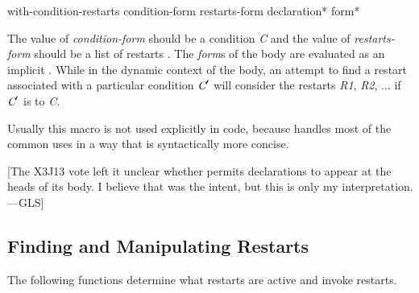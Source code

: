 \begin{defmac}
with-condition-restarts condition-form restarts-form
  {declaration}* {form}*

The value of \emph{condition-form} should be a condition \emph{C} and
the value of \emph{restarts-form} should be a list of restarts .
      The \emph{form\/}s of the body are evaluated as an implicit .
      While in the dynamic context of the body,
      an attempt to find a restart associated with a particular
      condition $\emph{C}'$ will 
      consider the restarts \emph{R1}, \emph{R2}, $\ldots$ if $\emph{C}'$ is  to \emph{C}.

     Usually this macro is not used explicitly in code, because
      handles most of the common uses in a way that is
     syntactically more concise.

[The X3J13 vote  left it unclear whether 
permits declarations to appear at the heads of its body.
I believe that was the intent, but this is only my interpretation.---GLS]

\end{defmac}


\subsection{Finding and Manipulating Restarts}

The following functions determine what restarts are
active and invoke restarts.

